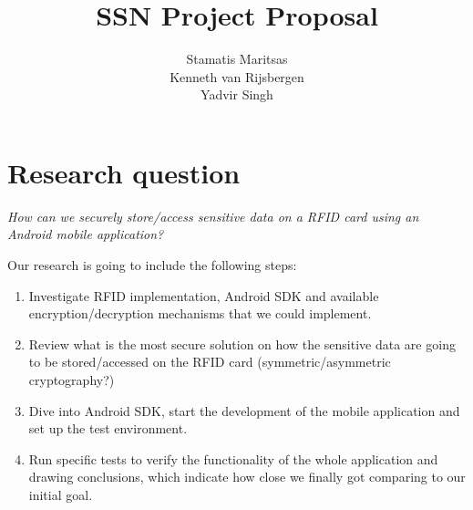 \documentclass[11pt]{article}
\title{\textbf{SSN Project Proposal}}
\author{Stamatis Maritsas\\
		Kenneth van Rijsbergen\\
		Yadvir Singh}
\date{}
\begin{document}
\maketitle




\section{Research question}

\begin{framed}
\noindent \textit{How can we securely store/access sensitive data on a RFID card using an Android mobile application?}
\end{framed}
Our research is going to include the following steps:

\begin{enumerate}
\item{Investigate RFID implementation, Android SDK and available encryption/decryption mechanisms that we could implement.}
\item{Review what is the most secure solution on how the sensitive data are going to be stored/accessed on the RFID card (symmetric/asymmetric cryptography?)}
\item{Dive into Android SDK, start the development of the mobile application and set up the test environment.}
\item{Run specific tests to verify the functionality of the whole application and drawing conclusions, which indicate how close we finally got comparing to our initial goal.}
\end{enumerate}

\clearpage
\end{document}
